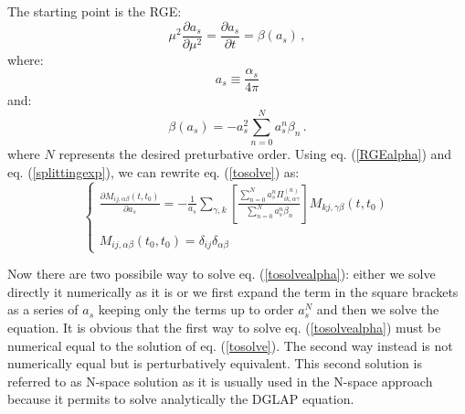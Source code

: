 \documentclass[10pt,a4paper]{article}
\begin{document}
The starting point is the RGE:
\begin{equation}\label{RGEalpha}
\mu^2\frac{\partial a_s}{\partial \mu^2} = \frac{\partial
  a_s}{\partial t} = \beta(a_s)\,,
\end{equation}
where:
\begin{equation}
a_s \equiv \frac{\alpha_s}{4\pi}
\end{equation}
and:
\begin{equation}
\beta(a_s) = -a_s^2 \sum_{n=0}^{N} a_s^n \beta_n \,.
\end{equation}
where $N$ represents the desired preturbative order.
Using eq. (\ref{RGEalpha}) and eq. (\ref{splittingexp}), we can
rewrite eq. (\ref{tosolve}) as:
\begin{equation}\label{tosolvealpha}
\left\{\begin{array}{l}
\displaystyle \frac{\partial  M_{ij,\alpha\beta}(t,t_0)}{\partial
  a_s}= -\frac{1}{a_s}\sum_{\gamma,k} \left[\frac{\displaystyle \sum_{n=0}^N a_s^n
    \Pi_{ik,\alpha\gamma}^{(n)}}{ \displaystyle \sum_{n=0}^{N} a_s^n \beta_n}\right]M_{kj,\gamma\beta}(t,t_0)\\
\\
\displaystyle M_{ij,\alpha\beta}(t_0,t_0)=\delta_{ij}\delta_{\alpha\beta}
\end{array}\right.
\end{equation}

Now there are two possibile way to solve eq. (\ref{tosolvealpha}):
either we solve directly it numerically as it is or we first expand
the term in the square brackets as a series of $a_s$ keeping only the
terms up to order $a_s^N$ and then we solve the equation. It is
obvious that the first way to solve eq. (\ref{tosolvealpha}) must be
numerical equal to the solution of
eq. (\ref{tosolve}). The second way instead is not numerically equal
but is perturbatively equivalent. This second solution is referred to
as N-space solution as it is usually used in the N-space approach
because it permits to solve analytically the DGLAP equation.
\end{document}
